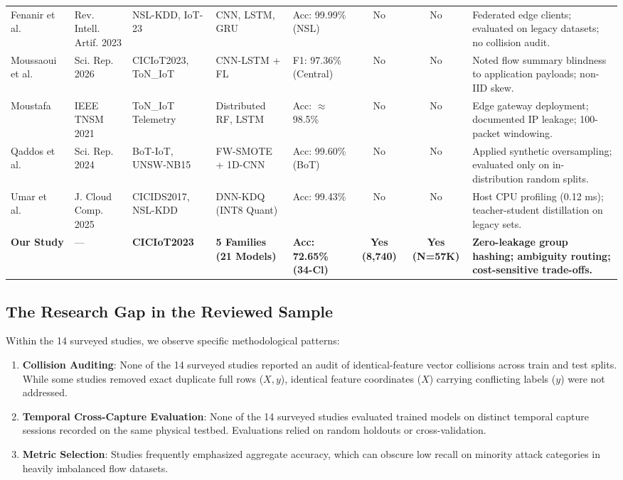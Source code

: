 \documentclass[conference,10pt,twocolumn]{IEEEtran}
\begin{document}
\begin{table}[t]
\begin{tabularx}{\textwidth}{@{}lp{3.2cm}p{2.6cm}p{2.4cm}p{2.3cm}ccp{3.2cm}@{}}
Fenanir et al.~\cite{fenanir2023smart} & Rev. Intell. Artif. 2023 & NSL-KDD, IoT-23 & CNN, LSTM, GRU & Acc: 99.99\% (NSL) & No & No & Federated edge clients; evaluated on legacy datasets; no collision audit. \\
Moussaoui et al.~\cite{moussaoui2026resilient} & Sci. Rep. 2026 & CICIoT2023, ToN\_IoT & CNN-LSTM + FL & F1: 97.36\% (Central) & No & No & Noted flow summary blindness to application payloads; non-IID skew. \\
Moustafa~\cite{moustafa2021distributed} & IEEE TNSM 2021 & ToN\_IoT Telemetry & Distributed RF, LSTM & Acc: $\approx$98.5\% & No & No & Edge gateway deployment; documented IP leakage; 100-packet windowing. \\
Qaddos et al.~\cite{qaddos2024novel} & Sci. Rep. 2024 & BoT-IoT, UNSW-NB15 & FW-SMOTE + 1D-CNN & Acc: 99.60\% (BoT) & No & No & Applied synthetic oversampling; evaluated only on in-distribution random splits. \\
Umar et al.~\cite{umar2025energy} & J. Cloud Comp. 2025 & CICIDS2017, NSL-KDD & DNN-KDQ (INT8 Quant) & Acc: 99.43\% & No & No & Host CPU profiling (0.12 ms); teacher-student distillation on legacy sets. \\ \midrule
\textbf{Our Study} & --- & \textbf{CICIoT2023} & \textbf{5 Families (21 Models)} & \textbf{Acc: 72.65\% (34-Cl)} & \textbf{Yes (8,740)} & \textbf{Yes (N=57K)} & \textbf{Zero-leakage group hashing; ambiguity routing; cost-sensitive trade-offs.} \\ \bottomrule
\end{tabularx}
\end{table}

\subsection{The Research Gap in the Reviewed Sample}
Within the 14 surveyed studies, we observe specific methodological patterns:
\begin{enumerate}
    \item \textbf{Collision Auditing}: None of the 14 surveyed studies reported an audit of identical-feature vector collisions across train and test splits. While some studies removed exact duplicate full rows ($X, y$), identical feature coordinates ($X$) carrying conflicting labels ($y$) were not addressed.
    \item \textbf{Temporal Cross-Capture Evaluation}: None of the 14 surveyed studies evaluated trained models on distinct temporal capture sessions recorded on the same physical testbed. Evaluations relied on random holdouts or cross-validation.
    \item \textbf{Metric Selection}: Studies frequently emphasized aggregate accuracy, which can obscure low recall on minority attack categories in heavily imbalanced flow datasets.
\end{enumerate}
\end{document}
